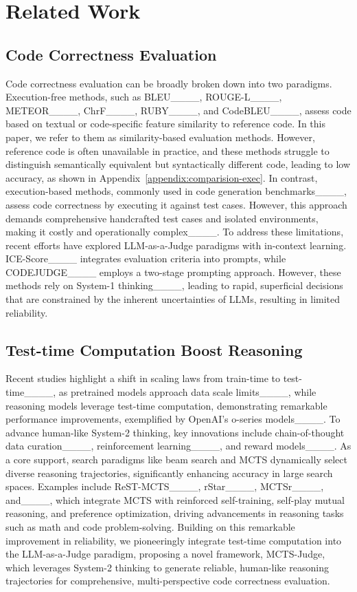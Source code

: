\section{Related Work}
\subsection{Code Correctness Evaluation} 
Code correctness evaluation can be broadly broken down into two paradigms.
Execution-free methods, such as BLEU____, ROUGE-L____, METEOR____, ChrF____, RUBY____, and CodeBLEU____, assess code based on textual or code-specific feature similarity to reference code.
In this paper, we refer to them as similarity-based evaluation methods. 
However, reference code is often unavailable in practice, and these methods struggle to distinguish semantically equivalent but syntactically different code, leading to low accuracy, as shown in Appendix~\ref{appendix:comparision-exec}.
In contrast, execution-based methods, commonly used in code generation benchmarks____, assess code correctness by executing it against test cases. 
However, this approach demands comprehensive handcrafted test cases and isolated environments, making it costly and operationally complex____.
To address these limitations, recent efforts have explored LLM-as-a-Judge paradigms with in-context learning. ICE-Score____ integrates evaluation criteria into prompts, while CODEJUDGE____ employs a two-stage prompting approach. However, these methods rely on System-1 thinking____, leading to rapid, superficial decisions that are constrained by the inherent uncertainties of LLMs, resulting in limited reliability.

\subsection{Test-time Computation Boost Reasoning}
Recent studies highlight a shift in scaling laws from train-time to test-time____, as pretrained models approach data scale limits____, while reasoning models leverage test-time computation, demonstrating remarkable performance improvements, exemplified by OpenAI's o-series models____.
To advance human-like System-2 thinking, key innovations include chain-of-thought data curation____, reinforcement learning____, and reward models____.
As a core support, search paradigms like beam search and MCTS dynamically select diverse reasoning trajectories, significantly enhancing accuracy in large search spaces. Examples include ReST-MCTS____, rStar____, MCTSr____, and____, which integrate MCTS with reinforced self-training, self-play mutual reasoning, and preference optimization, driving advancements in reasoning tasks such as math and code problem-solving.
Building on this remarkable improvement in reliability, we pioneeringly integrate test-time computation into the LLM-as-a-Judge paradigm, proposing a novel framework, MCTS-Judge, which leverages System-2 thinking to generate reliable, human-like reasoning trajectories for comprehensive, multi-perspective code correctness evaluation.